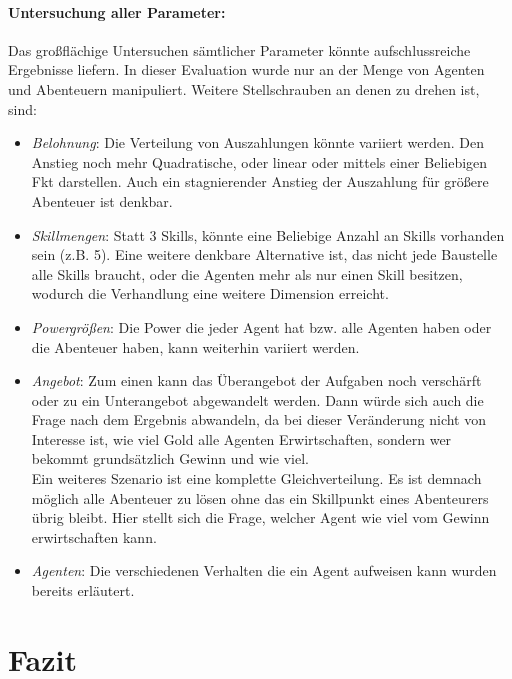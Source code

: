\documentclass[fleqn,10pt]{SelfArx} %
\begin{document}
\paragraph{Untersuchung aller Parameter:}
Das großflächige Untersuchen sämtlicher Parameter könnte aufschlussreiche Ergebnisse liefern. In dieser Evaluation wurde nur an der Menge von Agenten und Abenteuern manipuliert. Weitere Stellschrauben an denen zu drehen ist, sind:
\begin{itemize}
	\item \textit{Belohnung}: Die Verteilung von Auszahlungen könnte variiert werden. Den Anstieg noch mehr Quadratische, oder linear oder mittels einer Beliebigen Fkt darstellen. Auch ein stagnierender Anstieg der Auszahlung für größere Abenteuer ist denkbar.
	\item \textit{Skillmengen}: Statt 3 Skills, könnte eine Beliebige Anzahl an Skills vorhanden sein (z.B. 5). Eine weitere denkbare Alternative ist, das nicht jede Baustelle alle Skills braucht, oder die Agenten mehr als nur einen Skill besitzen, wodurch die Verhandlung eine weitere Dimension erreicht. 
	\item \textit{Powergrößen}: Die Power die jeder Agent hat bzw. alle Agenten haben oder die Abenteuer haben, kann weiterhin variiert werden.
	\item \textit{Angebot}: Zum einen kann das Überangebot der Aufgaben noch verschärft oder zu ein Unterangebot abgewandelt werden. Dann würde sich auch die Frage nach dem Ergebnis abwandeln, da bei dieser Veränderung nicht von Interesse ist, wie viel Gold alle Agenten Erwirtschaften, sondern wer bekommt grundsätzlich Gewinn und wie viel. \\
	Ein weiteres Szenario ist eine komplette Gleichverteilung. Es ist demnach möglich alle Abenteuer zu lösen ohne das ein Skillpunkt eines Abenteurers übrig bleibt. Hier stellt sich die Frage, welcher Agent wie viel vom Gewinn erwirtschaften kann.
	\item \textit{Agenten}: Die verschiedenen Verhalten die ein Agent aufweisen kann wurden bereits erläutert.
\end{itemize}




\section{Fazit}
\label{sec:Conclusion}






\end{document}
